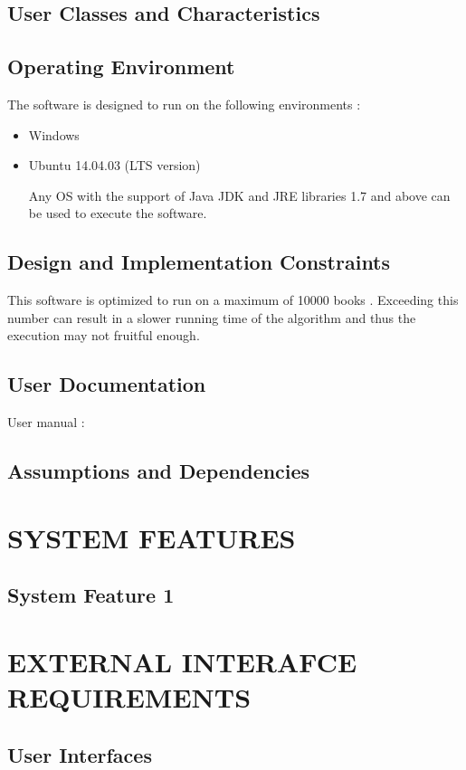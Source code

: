 \documentclass{article}
\begin{document}
\subsection{User Classes and Characteristics}

\subsection{Operating Environment}
The software is designed to run on the following environments :
\begin{itemize}
\item Windows 
\item Ubuntu 14.04.03 (LTS version)

Any OS with the support of Java JDK and JRE libraries 1.7 and above can be used to execute the software.
\end{itemize}

\subsection{Design and Implementation Constraints}
This software is optimized to run on a maximum of 10000 books .
Exceeding this number can result in a slower running time of the algorithm and thus the execution may not fruitful enough.

\subsection{User Documentation}
User manual $:$

\subsection{Assumptions and Dependencies}


\section{SYSTEM FEATURES}
\subsection{System Feature 1}

\section{EXTERNAL INTERAFCE REQUIREMENTS}
\subsection{User Interfaces}
\end{document}
